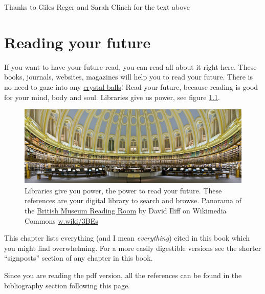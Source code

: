 \documentclass[
]{book}
\begin{document}
Thanks to Giles Reger and Sarah Clinch for the text above 🙏

\hypertarget{reading}{%
\chapter{Reading your future}\label{reading}}

If you want to have your future read, you can read all about it right here. These books, journals, websites, magazines will help you to read your future. There is no need to gaze into any \href{https://en.wikipedia.org/wiki/Crystal_ball}{crystal balls}! Read your future, because reading is good for your mind, body and soul. Libraries give us power, see figure \ref{fig:library-power-fig}.

\begin{figure}

{\centering \includegraphics[width=1\linewidth]{images/Libraries_Give_Us_Power} 

}

\caption{Libraries give you power, the power to read your future. These references are your digital library to search and browse. Panorama of the \href{https://en.wikipedia.org/wiki/British_Museum_Reading_Room}{British Museum Reading Room} by David Iliff on Wikimedia Commons \href{https://w.wiki/3BEs}{w.wiki/3BEs}}\label{fig:library-power-fig}
\end{figure}



This chapter lists everything (and I mean \emph{everything}) cited in this book which you might find overwhelming. For a more easily digestible versions see the shorter ``signposts'' section of any chapter in this book.

Since you are reading the pdf version, all the references can be found in the bibliography section following this page.

  
\end{document}
